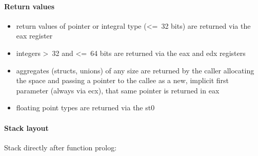 \paragraph{Return values}

\begin{itemize}
\item return values of pointer or integral type (\textless=\ 32 bits) are returned via the eax register
\item integers \textgreater\ 32 and \textless=\ 64 bits are returned via the eax and edx registers
\item aggregates (structs, unions) of any size are returned by the caller allocating the space and
passing a pointer to the callee as a new, implicit first parameter (always via ecx), that same pointer is returned in eax
\item floating point types are returned via the st0
\end{itemize}


\paragraph{Stack layout}

Stack directly after function prolog:\\

